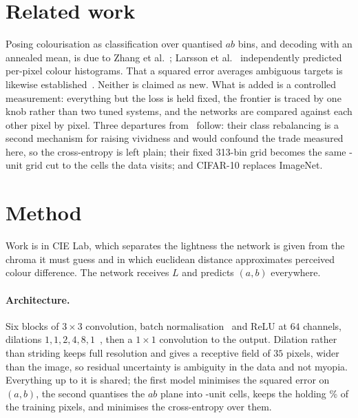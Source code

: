 \documentclass{article}
\begin{document}
\section{Related work}

Posing colourisation as classification over quantised $ab$ bins, and decoding
with an annealed mean, is due to Zhang et al.~\cite{zhang2016colorful}; Larsson
et al.~\cite{larsson2016learning} independently predicted per-pixel colour
histograms. That a squared error averages ambiguous targets is likewise
established~\cite{mathieu2016beyond}. Neither is claimed as new. What is added
is a controlled measurement: everything but the loss is held fixed, the frontier
is traced by one knob rather than two tuned systems, and the networks are
compared against each other pixel by pixel. Three departures
from~\cite{zhang2016colorful} follow: their class rebalancing is a second
mechanism for raising vividness and would confound the trade measured here, so
the cross-entropy is left plain; their fixed 313-bin grid becomes the same
\BinSize{}-unit grid cut to the cells the data visits; and CIFAR-10 replaces
ImageNet.

\section{Method}

Work is in CIE Lab, which separates the lightness the network is given from the
chroma it must guess and in which euclidean distance approximates perceived
colour difference. The network receives $L$ and predicts $(a,b)$ everywhere.

\paragraph*{Architecture.} Six blocks of $3\times3$ convolution, batch
normalisation~\cite{ioffe2015batchnorm} and ReLU at $64$ channels, dilations
$1,1,2,4,8,1$~\cite{yu2016dilated}, then a $1\times1$ convolution to the output.
Dilation rather than striding keeps full resolution and gives a receptive field
of $35$ pixels, wider than the image, so residual uncertainty is ambiguity in
the data and not myopia. Everything up to it is shared; the first model
minimises the squared error on $(a,b)$, the second quantises the $ab$ plane into
\BinSize{}-unit cells, keeps the \NBins{} holding \BinCoverage{}\% of the
training pixels, and minimises the cross-entropy over them.
\end{document}

